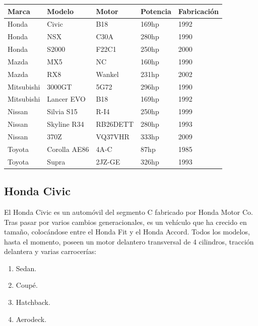 \documentclass[10pt,a4paper]{report}
\begin{document}
\begin{table}[htbp]
\begin{center}
\begin{tabular}{|l|l|l|l|l|}
\hline
Marca & Modelo & Motor & Potencia & Fabricación \\
\hline \hline
Honda & Civic & B18 & 169hp & 1992 \\ \hline
Honda & NSX & C30A & 280hp & 1990 \\ \hline
Honda & S2000 & F22C1 & 250hp & 2000 \\ \hline
Mazda & MX5 & NC & 160hp & 1990 \\ \hline
Mazda & RX8 & Wankel & 231hp & 2002 \\ \hline
Mitsubishi & 3000GT & 5G72 & 296hp & 1990 \\ \hline
Mitsubishi & Lancer EVO & B18 & 169hp & 1992 \\ \hline
Nissan & Silvia S15 & R-I4 & 250hp & 1999 \\ \hline
Nissan & Skyline R34 & RB26DETT & 280hp & 1993 \\ \hline
Nissan & 370Z & VQ37VHR & 333hp & 2009 \\ \hline
Toyota & Corolla AE86 & 4A-C & 87hp & 1985 \\ \hline
Toyota & Supra & 2JZ-GE & 326hp & 1993 \\ \hline
\end{tabular}
\label{tabla:sencilla}
\end{center}
\end{table}
\subsection{Honda Civic}
El Honda Civic es un automóvil del segmento C fabricado por Honda Motor Co. Tras pasar por varios cambios generacionales, es un vehículo que ha crecido en tamaño, colocándose entre el Honda Fit y el Honda Accord.
Todos los modelos, hasta el momento, poseen un motor delantero transversal de 4 cilindros, tracción delantera y varias carrocerías:
\begin{enumerate}
\item Sedan.
\item Coupé.
\item Hatchback.
\item Aerodeck.
\end{enumerate}
\end{document}
